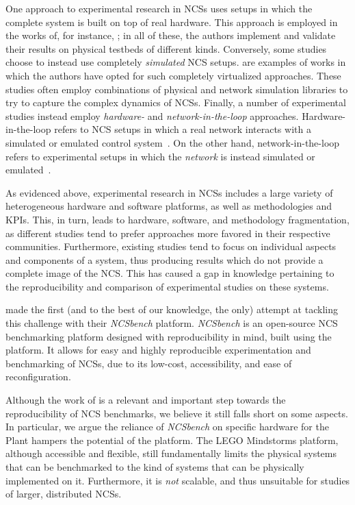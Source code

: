 One approach to experimental research in \acp{NCS} uses setups in which the complete system is built on top of real hardware.
This approach is employed in the works of, for instance, \textcite{Drew2005NCSWLAN,Li2014Wireless,Baumann2018LowPower,Cuenca2019UAV}; in all of these, the authors implement and validate their results on physical testbeds of different kinds.
Conversely, some studies choose to instead use completely \emph{simulated} \ac{NCS} setups.
\textcite{Du2009Smith,Wu2012NPC,Chen2015synccontrol,Ma2019DynamicSched} are examples of works in which the authors have opted for such completely virtualized approaches.
These studies often employ combinations of physical and network simulation libraries to try to capture the complex dynamics of \acp{NCS}.
Finally, a number of experimental studies instead employ \emph{hardware-} and \emph{network-in-the-loop} approaches.
Hardware-in-the-loop refers to \ac{NCS} setups in which a real network interacts with a simulated or emulated control system~\cite{Wang2020VoltageControl}.
On the other hand, network-in-the-loop refers to experimental setups in which the \emph{network} is instead simulated or emulated~\cite{Natale2004InvPendEthernet}.

As evidenced above, experimental research in \acp{NCS} includes a large variety of heterogeneous hardware and software platforms, as well as methodologies and \acp{KPI}.
This, in turn, leads to hardware, software, and methodology fragmentation, as different studies tend to prefer approaches more favored in their respective communities.
Furthermore, existing studies tend to focus on individual aspects and components of a system, thus producing results which do not provide a complete image of the \ac{NCS}.
This has caused a gap in knowledge pertaining to the reproducibility and comparison of experimental studies on these systems.

\textcite{Zoppi2020NCSBench} made the first (and to the best of our knowledge, the only) attempt at tackling this challenge with their \emph{NCSbench} platform.
\emph{NCSbench} is an open-source \ac{NCS} benchmarking platform designed with reproducibility in mind, built using the ~\cite{LEGOMindstormsEV3} platform.
It allows for easy and highly reproducible experimentation and benchmarking of \acp{NCS}, due to its low-cost, accessibility, and ease of reconfiguration.

Although the work of \textcite{Zoppi2020NCSBench} is a relevant and important step towards the reproducibility of \ac{NCS} benchmarks, we believe it still falls short on some aspects.
In particular, we argue the reliance of \emph{NCSbench} on specific hardware for the Plant hampers the potential of the platform.
The LEGO Mindstorms platform, although accessible and flexible, still fundamentally limits the physical systems that can be benchmarked to the kind of systems that can be physically implemented on it.
Furthermore, it is \emph{not} scalable, and thus unsuitable for studies of larger, distributed \acp{NCS}.


